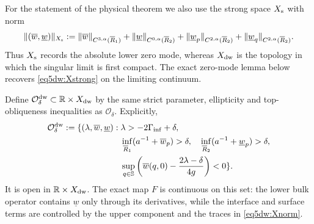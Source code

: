 \documentclass[11pt,reqno]{amsart}
\numberwithin{equation}{section}
\theoremstyle{definition}
\theoremstyle{remark}
\begin{document}
For the statement of the physical theorem we also use the strong
space $X_{\rm s}$ with norm
\begin{equation}\label{eq5dw:Xstrong}
 \|(\overline w,\underline w)\|_{X_{\rm s}}
 :=\|\overline w\|_{C^{3,\alpha}(\overline R_1)}
 +\|\underline w\|_{C^{0,\alpha}(\overline R_2)}
 +\|\underline w_p\|_{C^{2,\alpha}(\overline R_2)}
 +\|\underline w_q\|_{C^{2,\alpha}(\overline R_2)}.
\end{equation}
Thus $X_{\rm s}$ records the absolute lower zero mode, whereas
$X_{\rm dw}$ is the topology in which the singular limit is first
compact.  The exact zero-mode lemma below recovers
\eqref{eq5dw:Xstrong} on the limiting continuum.

Define $\mathcal O_\delta^{\rm dw}\subset\mathbb R\times X_{\rm dw}$
by the same strict parameter, ellipticity and top-obliqueness inequalities
as $\mathcal O_\delta$.  Explicitly,
\[
\begin{split}
 \mathcal O_\delta^{\rm dw}:=\{(\lambda,\overline w,\underline w):\;&
 \lambda>-2\Gamma_{\inf}+\delta,\\
 &\inf_{\overline R_1}(a^{-1}+\overline w_p)>\delta,\quad
 \inf_{\overline R_2}(a^{-1}+\underline w_p)>\delta,\\
 &\sup_{q\in\mathbb S}\left(\overline w(q,0)
 -\frac{2\lambda-\delta}{4g}\right)<0\}.
\end{split}
\]
It is open in $\mathbb R\times X_{\rm dw}$.  The exact map $F$ is
continuous on this set: the lower bulk operator contains
$\underline w$ only through its derivatives, while the interface and
surface terms are controlled by the upper component and the traces in
\eqref{eq5dw:Xnorm}.
\end{document}
